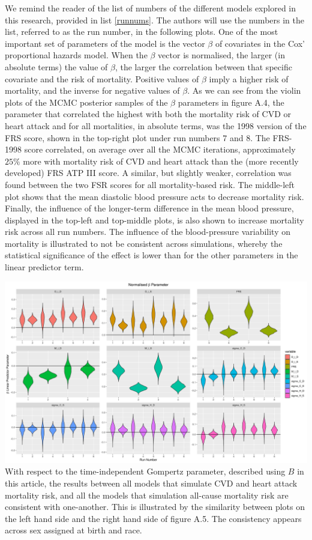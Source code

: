 \documentclass[
]{article}
\begin{document}
We remind the reader of the list of numbers of the different models
explored in this research, provided in list \ref{runnums}. The authors
will use the numbers in the list, referred to as the run number, in the
following plots. One of the most important set of parameters of the
model is the vector \(\beta\) of covariates in the Cox' proportional
hazards model. When the \(\beta\) vector is normalised, the larger (in
absolute terms) the value of \(\beta\), the larger the correlation
between that specific covariate and the risk of mortality. Positive
values of \(\beta\) imply a higher risk of mortality, and the inverse
for negative values of \(\beta\). As we can see from the violin plots of
the MCMC posterior samples of the \(\beta\) parameters in figure A.4,
the parameter that correlated the highest with both the mortality risk
of CVD or heart attack and for all mortalities, in absolute terms, was
the 1998 version of the FRS score, shown in the top-right plot under run
numbers 7 and 8. The FRS-1998 score correlated, on average over all the
MCMC iterations, approximately \(25\%\) more with mortality risk of CVD
and heart attack than the (more recently developed) FRS ATP III score. A
similar, but slightly weaker, correlation was found between the two FSR
scores for all mortality-based risk. The middle-left plot shows that the
mean diastolic blood pressure acts to decrease mortality risk. Finally,
the influence of the longer-term difference in the mean blood pressure,
displayed in the top-left and top-middle plots, is also shown to
increase mortality risk across all run numbers. The influence of the
blood-pressure variability on mortality is illustrated to not be
consistent across simulations, whereby the statistical significance of
the effect is lower than for the other parameters in the linear
predictor term.

\includegraphics{../Plots/beta/Beta_parameter_normalised.png} With
respect to the time-independent Gompertz parameter, described using
\(B\) in this article, the results between all models that simulate CVD
and heart attack mortality risk, and all the models that simulation
all-cause mortality risk are consistent with one-another. This is
illustrated by the similarity between plots on the left hand side and
the right hand side of figure A.5. The consistency appears across sex
assigned at birth and race.
\end{document}
